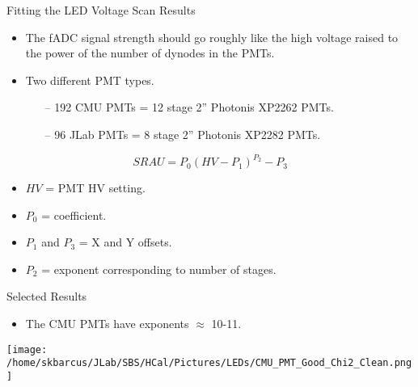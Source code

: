 \documentclass[10pt]{beamer}
\begin{document}
\begin{frame}{Fitting the LED Voltage Scan Results}

	\begin{itemize}
		\item The fADC signal strength should go roughly like the high voltage raised to the power of the number of dynodes in the PMTs.
		\item Two different PMT types.
			\begin{itemize}
				\item[--] 192 CMU PMTs = 12 stage 2'' Photonis XP2262 PMTs.
				\item[--] 96 JLab PMTs = 8 stage 2'' Photonis XP2282 PMTs.
			\end{itemize}
	\end{itemize}
	
	\begin{equation}
		SRAU = P_0\left( HV - P_1 \right)^{P_2}-P_3
	\end{equation}
	\begin{itemize}
		\item $HV$ = PMT HV setting.
		\item $P_0$ = coefficient.
		\item $P_1$ and $P_3$ = X and Y offsets.
		\item $P_2$ = exponent corresponding to number of stages.
	\end{itemize}

\end{frame}

\begin{frame}{Selected Results}

	\begin{itemize}
		\item The CMU PMTs have exponents $\approx$ 10-11.
	\end{itemize}
	
	\begin{center}
		\texttt{[image: /home/skbarcus/JLab/SBS/HCal/Pictures/LEDs/CMU\_PMT\_Good\_Chi2\_Clean.png]}
  	\end{center}

\end{frame}

%
%	
%
\end{document}
